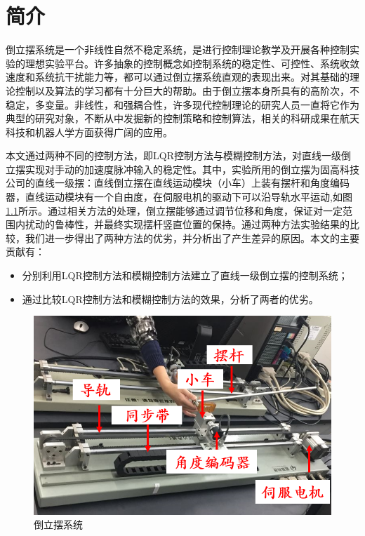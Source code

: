 \chapter{简介}
倒立摆系统是一个非线性自然不稳定系统，是进行控制理论教学及开展各种控制实验的理想实验平台。许多抽象的控制概念如控制系统的稳定性、可控性、系统收敛速度和系统抗干扰能力等，都可以通过倒立摆系统直观的表现出来。对其基础的理论控制以及算法的学习都有十分巨大的帮助。由于倒立摆本身所具有的高阶次，不稳定，多变量。非线性，和强耦合性，许多现代控制理论的研究人员一直将它作为典型的研究对象，不断从中发掘新的控制策略和控制算法，相关的科研成果在航天科技和机器人学方面获得广阔的应用。

本文通过两种不同的控制方法，即LQR控制方法与模糊控制方法，对直线一级倒立摆实现对手动的加速度脉冲输入的稳定性。其中，实验所用的倒立摆为固高科技公司的直线一级摆：直线倒立摆在直线运动模块（小车）上装有摆杆和角度编码器，直线运动模块有一个自由度，在伺服电机的驱动下可以沿导轨水平运动,如图\cref{fig:realthing}所示。通过相关方法的处理，倒立摆能够通过调节位移和角度，保证对一定范围内扰动的鲁棒性，并最终实现摆杆竖直位置的保持。通过两种方法实验结果的比较，我们进一步得出了两种方法的优劣，并分析出了产生差异的原因。本文的主要贡献有：
  \begin{itemize}
    \item 分别利用LQR控制方法和模糊控制方法建立了直线一级倒立摆的控制系统；
    \item 通过比较LQR控制方法和模糊控制方法的效果，分析了两者的优劣。
  \end{itemize}

\begin{figure}[hbpt]
\centering
\includegraphics[width=12cm]{realthing.png}
\caption{倒立摆系统}\label{fig:realthing}
\end{figure}



